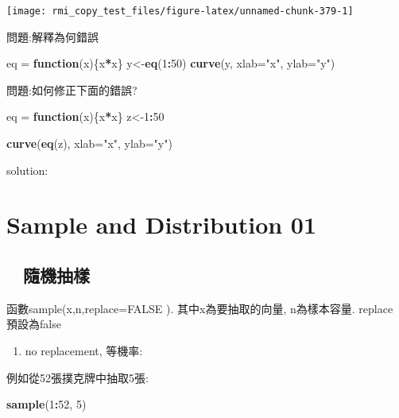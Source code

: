 \documentclass[]{book}
\newenvironment{Shaded}{\begin{snugshade}}{\end{snugshade}}
\newcommand{\KeywordTok}[1]{\textcolor[rgb]{0.13,0.29,0.53}{\textbf{#1}}}
\newcommand{\DataTypeTok}[1]{\textcolor[rgb]{0.13,0.29,0.53}{#1}}
\newcommand{\DecValTok}[1]{\textcolor[rgb]{0.00,0.00,0.81}{#1}}
\newcommand{\StringTok}[1]{\textcolor[rgb]{0.31,0.60,0.02}{#1}}
\newcommand{\ControlFlowTok}[1]{\textcolor[rgb]{0.13,0.29,0.53}{\textbf{#1}}}
\newcommand{\OperatorTok}[1]{\textcolor[rgb]{0.81,0.36,0.00}{\textbf{#1}}}
\newcommand{\NormalTok}[1]{#1}
\providecommand{\tightlist}{%
  \setlength{\itemsep}{0pt}\setlength{\parskip}{0pt}}
\theoremstyle{definition}
\theoremstyle{definition}
\theoremstyle{definition}
\theoremstyle{remark}
\begin{document}
\begin{center}\texttt{[image: rmi\_copy\_test\_files/figure-latex/unnamed-chunk-379-1]} \end{center}

問題:解釋為何錯誤

\begin{Shaded}
\begin{Highlighting}[]
\NormalTok{eq =}\StringTok{ }\ControlFlowTok{function}\NormalTok{(x)\{x}\OperatorTok{*}\NormalTok{x\}}
\NormalTok{y<-}\KeywordTok{eq}\NormalTok{(}\DecValTok{1}\OperatorTok{:}\DecValTok{50}\NormalTok{)}
\KeywordTok{curve}\NormalTok{(y, }\DataTypeTok{xlab=}\StringTok{"x"}\NormalTok{, }\DataTypeTok{ylab=}\StringTok{"y"}\NormalTok{)}
\end{Highlighting}
\end{Shaded}

問題:如何修正下面的錯誤?

\begin{Shaded}
\begin{Highlighting}[]
\NormalTok{eq =}\StringTok{ }\ControlFlowTok{function}\NormalTok{(x)\{x}\OperatorTok{*}\NormalTok{x\}}
\NormalTok{z<-}\DecValTok{1}\OperatorTok{:}\DecValTok{50}

\KeywordTok{curve}\NormalTok{(}\KeywordTok{eq}\NormalTok{(z), }\DataTypeTok{xlab=}\StringTok{"x"}\NormalTok{, }\DataTypeTok{ylab=}\StringTok{"y"}\NormalTok{)}
\end{Highlighting}
\end{Shaded}

solution:

\chapter{Sample and Distribution 01}\label{sample-and-distribution-01}

\section{　隨機抽樣}

函數sample(x,n,replace=FALSE ). 其中x為要抽取的向量, n為樣本容量.
replace 預設為false

\begin{enumerate}
\def\labelenumi{\arabic{enumi}.}
\tightlist
\item
  no replacement, 等機率:
\end{enumerate}

例如從52張撲克牌中抽取5張:

\begin{Shaded}
\begin{Highlighting}[]
\KeywordTok{sample}\NormalTok{(}\DecValTok{1}\OperatorTok{:}\DecValTok{52}\NormalTok{, }\DecValTok{5}\NormalTok{)}
\end{Highlighting}
\end{Shaded}
\end{document}
